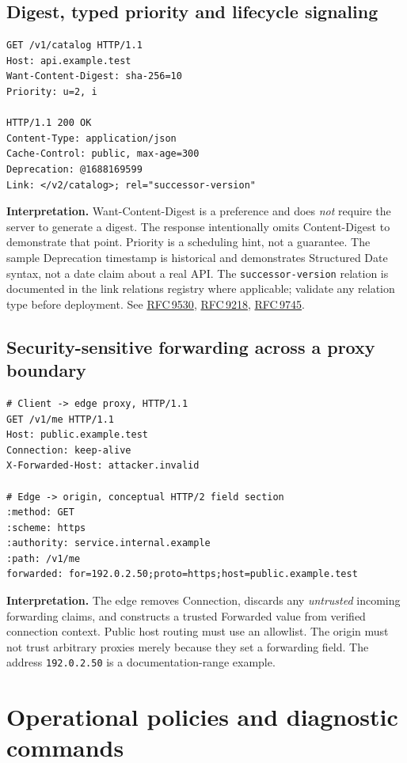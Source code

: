 \documentclass[10pt,letterpaper,oneside]{article}
\newcommand{\field}[1]{{\ttfamily\small\color{Deep}#1}}
\newcommand{\rf}[1]{\href{https://www.rfc-editor.org/rfc/rfc#1.html}{RFC\,#1}}
\begin{document}
\subsection{Digest, typed priority and lifecycle signaling}
\begin{lstlisting}
GET /v1/catalog HTTP/1.1
Host: api.example.test
Want-Content-Digest: sha-256=10
Priority: u=2, i

HTTP/1.1 200 OK
Content-Type: application/json
Cache-Control: public, max-age=300
Deprecation: @1688169599
Link: </v2/catalog>; rel="successor-version"
\end{lstlisting}
\textbf{Interpretation.} \field{Want-Content-Digest} is a preference and does \emph{not} require the server to generate a digest. The response intentionally omits \field{Content-Digest} to demonstrate that point. \field{Priority} is a scheduling hint, not a guarantee. The sample \field{Deprecation} timestamp is historical and demonstrates Structured Date syntax, not a date claim about a real API. The \texttt{successor-version} relation is documented in the link relations registry where applicable; validate any relation type before deployment. See \rf{9530}, \rf{9218}, \rf{9745}.

\subsection{Security-sensitive forwarding across a proxy boundary}
\begin{lstlisting}
# Client -> edge proxy, HTTP/1.1
GET /v1/me HTTP/1.1
Host: public.example.test
Connection: keep-alive
X-Forwarded-Host: attacker.invalid

# Edge -> origin, conceptual HTTP/2 field section
:method: GET
:scheme: https
:authority: service.internal.example
:path: /v1/me
forwarded: for=192.0.2.50;proto=https;host=public.example.test
\end{lstlisting}
\textbf{Interpretation.} The edge removes \field{Connection}, discards any \emph{untrusted} incoming forwarding claims, and constructs a trusted \field{Forwarded} value from verified connection context. Public host routing must use an allowlist. The origin must not trust arbitrary proxies merely because they set a forwarding field. The address \texttt{192.0.2.50} is a documentation-range example.

\section{Operational policies and diagnostic commands}
\end{document}
